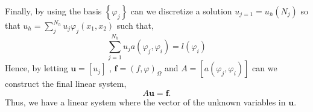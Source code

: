 Finally, by using the basis $\left\{ \varphi _{j} \right\} $ can we discretize a solution $u_{j=1} = u_{h}\left( N_{j} \right) $ so that $u_{h} = \sum_{j}^{N_{h}} u_{j} \varphi _{j}\left( x_{1},x_{2} \right)  $    such that, \[
\sum_{j = 1}^{N_{h}} u_{j} a\left( \varphi _{j}, \varphi _{i} \right)  = l\left( \varphi _{i} \right)
\]
Hence, by letting $\mathbf{u} = \left[ u_{j} \right] $ , $\mathbf{f} = \left( f, \varphi  \right) _{\Omega }$  and $A = \left[ a\left( \varphi _{j}, \varphi _{i} \right)  \right] $ can we construct the final linear system, \[
A \mathbf{u} =\mathbf{f}.
\]
Thus, we have a linear system where the vector of the unknown variables in $\mathbf{u}$.















